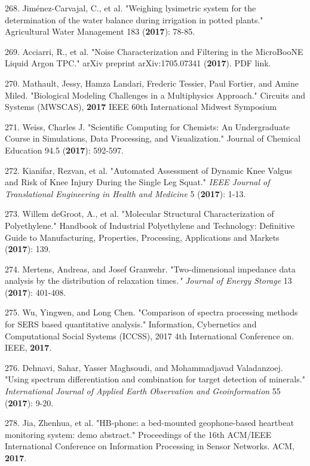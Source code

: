 268. Jim\'{e}nez-Carvajal, C., et al. "Weighing lysimetric system for the determination of the water balance during irrigation in potted plants." Agricultural Water Management 183 (\textbf{2017}): 78-85.

269. Acciarri, R., et al. "Noise Characterization and Filtering in the MicroBooNE Liquid Argon TPC." arXiv preprint arXiv:1705.07341 (\textbf{2017}). PDF link.

270. Mathault, Jessy, Hamza Landari, Frederic Tessier, Paul Fortier, and Amine Miled. "Biological Modeling Challenges in a Multiphysics Approach." Circuits and Systems (MWSCAS), \textbf{2017} IEEE 60th International Midwest Symposium

271. Weiss, Charles J. "Scientific Computing for Chemists: An Undergraduate Course in Simulations, Data Processing, and Visualization." Journal of Chemical Education 94.5 (\textbf{2017}): 592-597.

272. Kianifar, Rezvan, et al. "Automated Assessment of Dynamic Knee Valgus and Risk of Knee Injury During the Single Leg Squat." \textit{IEEE Journal of Translational Engineering in Health and Medicine} 5 (\textbf{2017}): 1-13.

273. Willem deGroot, A., et al. "Molecular Structural Characterization of Polyethylene." Handbook of Industrial Polyethylene and Technology: Definitive Guide to Manufacturing, Properties, Processing, Applications and Markets (\textbf{2017}): 139.

274. Mertens, Andreas, and Josef Granwehr. "Two-dimensional impedance data analysis by the distribution of relaxation times\textit{." Journal of Energy Storage} 13 (\textbf{2017}): 401-408.

275. Wu, Yingwen, and Long Chen. "Comparison of spectra processing methods for SERS based quantitative analysis." Information, Cybernetics and Computational Social Systems (ICCSS), 2017 4th International Conference on. IEEE, \textbf{2017}.

276. Dehnavi, Sahar, Yasser Maghsoudi, and Mohammadjavad Valadanzoej. "Using spectrum differentiation and combination for target detection of minerals." \textit{International Journal of Applied Earth Observation and Geoinformation} 55 (\textbf{2017}): 9-20.

278. Jia, Zhenhua, et al. "HB-phone: a bed-mounted geophone-based heartbeat monitoring system: demo abstract." Proceedings of the 16th ACM/IEEE International Conference on Information Processing in Sensor Networks. ACM, \textbf{2017}.

